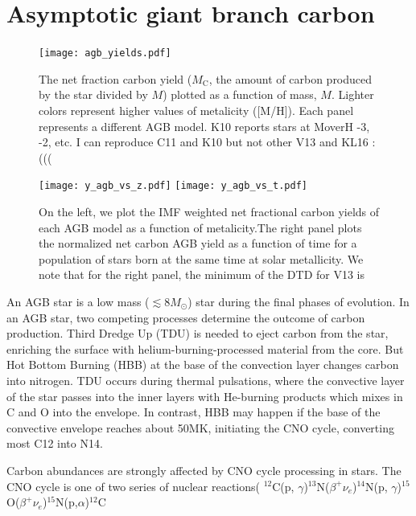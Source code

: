 \documentclass[12pt,oneside]{report}
\newcommand{\sun}{\ensuremath{\odot}}
\begin{document}
\section{Asymptotic giant branch carbon}

\begin{figure}
    \centering
 	    \texttt{[image: agb\_yields.pdf]}\\

        \caption[AGB carbon yields]{The net fraction carbon yield ($M_\text{C}$, the amount of carbon produced by the star divided by $M$) plotted as a function of mass, $M$. Lighter colors represent higher values of metalicity ([M/H]). Each panel represents a different AGB model. K10 reports stars at MoverH -3, -2, etc. I can reproduce C11 and K10 but not other V13 and KL16 :(((}

    \label{fig:y_agb}
\end{figure}

\begin{figure}
    \centering
    
    \texttt{[image: y\_agb\_vs\_z.pdf]}
    \texttt{[image: y\_agb\_vs\_t.pdf]}

    \caption[SSP AGB carbon]{On the left, we plot the IMF weighted net fractional carbon yields of each AGB model as a function of metalicity.The right panel plots the normalized net carbon AGB yield as a function of time for a population of stars born at the same time at solar metallicity. We note that for the right panel, the minimum of the DTD for V13 is }

\end{figure}

An AGB star is a low mass ($\lesssim 8 M_{\sun}$) star during the final phases of evolution.  In an AGB star, two competing processes determine the outcome of carbon production.
Third Dredge Up (TDU) is needed to eject carbon from the star, enriching the surface with helium-burning-processed material from the core. But Hot Bottom Burning (HBB) at the base of the convection layer changes carbon into nitrogen. 
TDU occurs during thermal pulsations, where the convective layer of the star passes into the inner layers with He-burning products which mixes in C and O into the envelope. In contrast, HBB may happen if the base of the convective envelope reaches about 50MK, initiating the CNO cycle, converting most C12 into N14. 

Carbon abundances are strongly affected by CNO cycle processing in stars. The CNO cycle is one of two series of nuclear reactions( $^{12}$C(p, $\gamma$)$^{13}$N($\beta^+ \nu_e$)$^{14}$N(p, $\gamma$)$^{15}$O($\beta^+\nu_e$)$^{15}$N(p,$\alpha$)$^{12}$C
\end{document}
